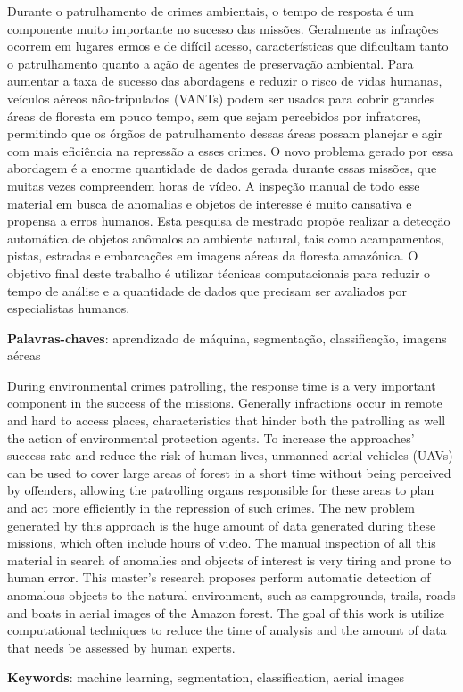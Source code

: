 \begin{resumo}
    Durante o patrulhamento de crimes ambientais, o tempo de resposta é um componente muito importante no sucesso das missões. Geralmente as infrações ocorrem em lugares ermos e de difícil acesso, características que dificultam tanto o patrulhamento quanto a ação de agentes de preservação ambiental. Para aumentar a taxa de sucesso das abordagens e reduzir o risco de vidas humanas, veículos aéreos não-tripulados (VANTs) podem ser usados para cobrir grandes áreas de floresta em pouco tempo, sem que sejam percebidos por infratores, permitindo que os órgãos de patrulhamento dessas áreas possam planejar e agir com mais eficiência na repressão a esses crimes. O novo problema gerado por essa abordagem é a enorme quantidade de dados gerada durante essas missões, que muitas vezes compreendem horas de vídeo. A inspeção manual de todo esse material em busca de anomalias e objetos de interesse é muito cansativa e propensa a erros humanos. Esta pesquisa de mestrado propõe realizar a detecção automática de objetos anômalos ao ambiente natural, tais como acampamentos, pistas, estradas e embarcações em imagens aéreas da floresta amazônica. O objetivo final deste trabalho é utilizar técnicas computacionais para reduzir o tempo de análise e a quantidade de dados que precisam ser avaliados por especialistas humanos.

    \vspace{\onelineskip}
    \noindent
    \textbf{Palavras-chaves}: aprendizado de máquina, segmentação, classificação, imagens aéreas
\end{resumo}

\begin{resumo}[Abstract]
    During environmental crimes patrolling, the response time is a very important component in the success of the missions. Generally infractions occur in remote and hard to access places, characteristics that hinder both the patrolling as well the action of environmental protection agents. To increase the approaches' success rate and reduce the risk of human lives, unmanned aerial vehicles (UAVs) can be used to cover large areas of forest in a short time without being perceived by offenders, allowing the patrolling organs responsible for these areas to plan and act more efficiently in the repression of such crimes. The new problem generated by this approach is the huge amount of data generated during these missions, which often include hours of video. The manual inspection of all this material in search of anomalies and objects of interest is very tiring and prone to human error. This master's research proposes perform automatic detection of anomalous objects to the natural environment, such as campgrounds, trails, roads and boats in aerial images of the Amazon forest. The goal of this work is utilize computational techniques to reduce the time of analysis and the amount of data that needs be assessed by human experts.
    
    \vspace{\onelineskip}
    \noindent
    \textbf{Keywords}: machine learning, segmentation, classification, aerial images
\end{resumo}
